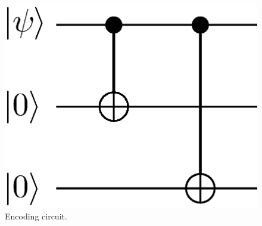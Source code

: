 \documentclass[a4paper,11pt]{ltjsarticle}
\begin{document}
{{{            \begin{figure}[h]
                \centering
                \includegraphics[scale=0.40]{figure/encoding_repetition.eps}
                \vspace{-40pt}\caption{Encoding circuit.}
                \label{encoding_repetition}
                \vspace{-15pt}
            \end{figure}

}}}
\end{document}
